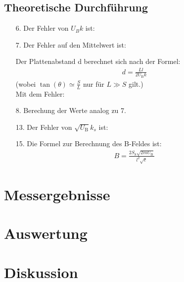\documentclass[12pt]{scrartcl}
\begin{document}
\subsection{Theoretische Durchführung}
\begin{itemize}
\item[6.]
Der Fehler von $U_B k$ ist:

\item[7.]
Der Fehler auf den Mittelwert ist:

Der Plattenabstand d berechnet sich nach der Formel:
\begin{align}
d= \frac{L l}{2 U_\text{B} k}
\end{align}
(wobei $\tan(\theta) \simeq \frac{S}{L}$ nur für $L \gg S$ gilt.)\\
Mit dem Fehler:
\item[8.]
Berechung der Werte analog zu 7.
\item[13.]
Der Fehler von $\sqrt{U_\text{B}}k_s$ ist:
\item[15.]
Die Formel zur Berechnung des B-Feldes ist:
\begin{align}
B = \frac{2 S_\text{S}\sqrt{2mU_\text{B}}}{l^2 \sqrt{e}}
\end{align}
\end{itemize}

\section{Messergebnisse}



\section{Auswertung}


\section{Diskussion}


\end{document}
